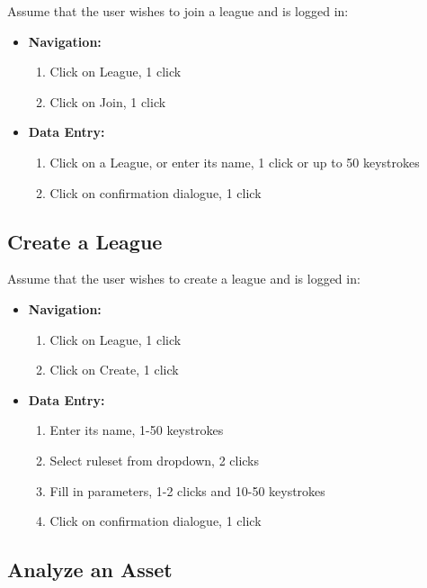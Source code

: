 Assume that the user wishes to join a league and is logged in:\\

\begin{itemize}
\item \textbf{Navigation: }
\begin{enumerate}
\item Click on League, 1 click
\item Click on Join, 1 click
\end{enumerate}
\item \textbf{Data Entry: }
\begin{enumerate}
\item Click on a League, or enter its name, 1 click or up to 50 keystrokes
\item Click on confirmation dialogue, 1 click
\end{enumerate}
\end{itemize}

\subsection{Create a League}

Assume that the user wishes to create a league and is logged in:\\

\begin{itemize}
\item \textbf{Navigation: }
\begin{enumerate}
\item Click on League, 1 click
\item Click on Create, 1 click
\end{enumerate}
\item \textbf{Data Entry: }
\begin{enumerate}
\item Enter its name, 1-50 keystrokes
\item Select ruleset from dropdown, 2 clicks
\item Fill in parameters, 1-2 clicks and 10-50 keystrokes
\item Click on confirmation dialogue, 1 click
\end{enumerate}
\end{itemize}

\subsection{Analyze an Asset}

